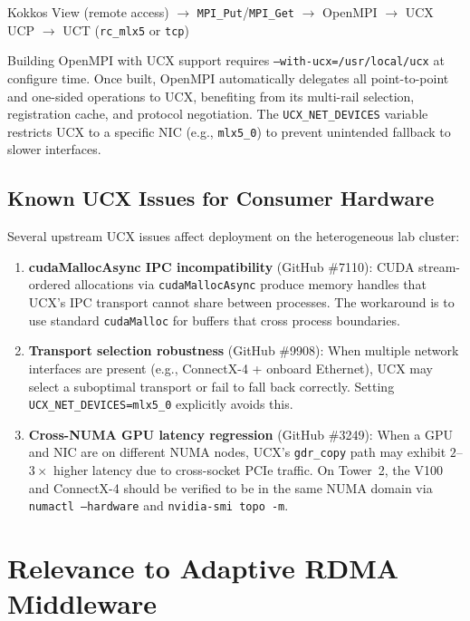 \documentclass[11pt,letterpaper]{article}
\begin{document}
\begin{center}
Kokkos View (remote access) $\to$ \texttt{MPI\_Put}/\texttt{MPI\_Get} $\to$ OpenMPI $\to$ UCX UCP $\to$ UCT (\texttt{rc\_mlx5} or \texttt{tcp})
\end{center}

Building OpenMPI with UCX support requires \texttt{--with-ucx=/usr/local/ucx} at configure time. Once built, OpenMPI automatically delegates all point-to-point and one-sided operations to UCX, benefiting from its multi-rail selection, registration cache, and protocol negotiation. The \texttt{UCX\_NET\_DEVICES} variable restricts UCX to a specific NIC (e.g., \texttt{mlx5\_0}) to prevent unintended fallback to slower interfaces.

\subsection{Known UCX Issues for Consumer Hardware}

Several upstream UCX issues affect deployment on the heterogeneous lab cluster:

\begin{enumerate}[noitemsep]
    \item \textbf{cudaMallocAsync IPC incompatibility} (GitHub \#7110): CUDA stream-ordered allocations via \texttt{cudaMallocAsync} produce memory handles that UCX's IPC transport cannot share between processes. The workaround is to use standard \texttt{cudaMalloc} for buffers that cross process boundaries.

    \item \textbf{Transport selection robustness} (GitHub \#9908): When multiple network interfaces are present (e.g., ConnectX-4 + onboard Ethernet), UCX may select a suboptimal transport or fail to fall back correctly. Setting \texttt{UCX\_NET\_DEVICES=mlx5\_0} explicitly avoids this.

    \item \textbf{Cross-NUMA GPU latency regression} (GitHub \#3249): When a GPU and NIC are on different NUMA nodes, UCX's \texttt{gdr\_copy} path may exhibit $2$--$3\times$ higher latency due to cross-socket PCIe traffic. On Tower~2, the V100 and ConnectX-4 should be verified to be in the same NUMA domain via \texttt{numactl --hardware} and \texttt{nvidia-smi topo -m}.
\end{enumerate}

\section{Relevance to Adaptive RDMA Middleware}
\label{sec:relevance}
\end{document}
